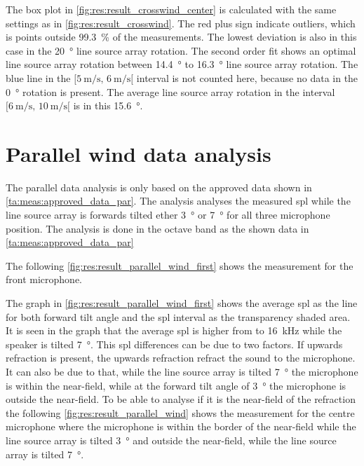 The box plot in \autoref{fig:res:result_crosswind_center} is calculated with the same settings as in  \autoref{fig:res:result_crosswind}. The red plus sign indicate outliers, which is points outside \SI{99.3}{\percent} of the measurements. The lowest deviation is also in this case in the \SI{20}{\degree} line source array rotation. The second order fit shows an optimal line source array rotation between \SI{14.4}{\degree} to \SI{16.3}{\degree} line source array rotation. The blue line in the $[\SI{5}{\meter\per\second},\, \SI{6}{\meter\per\second}[ $ interval is not counted here, because no data in the \SI{0}{\degree} rotation is present. The average line source array rotation in the interval $[\SI{6}{\meter\per\second},\, \SI{10}{\meter\per\second}[ $ is in this \SI{15.6}{\degree}.
  
  

\section{Parallel wind data analysis}\label{res:par_data_ana}

The parallel data analysis is only based on the approved data shown in \autoref{ta:meas:approved_data_par}. The analysis analyses the measured \gls{spl} while the line source array is forwards tilted ether \SI{3}{\degree} or  \SI{7}{\degree} for all three microphone position. The analysis is done in the octave band as the shown data in \autoref{ta:meas:approved_data_par}

 The following \autoref{fig:res:result_parallel_wind_first}  shows the measurement for the front microphone.

  
The graph in \autoref{fig:res:result_parallel_wind_first} shows the average \gls{spl} as the line for both forward tilt angle and the \gls{spl} interval as the transparency shaded area.
It is seen in the graph that the average \gls{spl} is higher from  to \SI{16}{\kilo\hertz} while the speaker is tilted \SI{7}{\degree}. This \gls{spl} differences can be due to two factors. If upwards refraction is present, the upwards refraction refract the sound to the microphone. It can also be due to that, while the line source array is tilted \SI{7}{\degree} the microphone is within the near-field, while at the forward tilt angle of \SI{3}{\degree} the microphone is outside the near-field. To be able to analyse if it is the near-field of the refraction the following \autoref{fig:res:result_parallel_wind} shows the measurement for the centre microphone where the microphone is within the border of the near-field while the line source array is tilted \SI{3}{\degree} and outside the near-field, while the line source array is tilted \SI{7}{\degree}.
 

